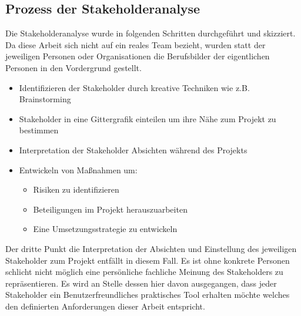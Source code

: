 \documentclass[pagesize, paper=a4, fontsize=12pt, titlepage=true, headings=small, headnosepline, abstractoff, liststotoc, nochapterprefix, plainheadsepline, twoside]{scrreprt}
\begin{document}
\subsection{Prozess der Stakeholderanalyse}
Die Stakeholderanalyse wurde in folgenden Schritten durchgeführt und skizziert. Da diese Arbeit sich nicht auf ein reales Team bezieht, wurden statt der jeweiligen Personen oder Organisationen die Berufsbilder der eigentlichen Personen in den Vordergrund gestellt.
\begin{itemize}
\item Identifizieren der Stakeholder durch kreative Techniken wie z.B. Brainstorming
\item Stakeholder in eine Gittergrafik einteilen um ihre Nähe zum Projekt zu bestimmen
\item Interpretation der Stakeholder Absichten während des Projekts
\item Entwickeln von Maßnahmen um:
	\begin{itemize}
	\item Risiken zu identifizieren
	\item Beteiligungen im Projekt herauszuarbeiten
	\item Eine Umsetzungsstrategie zu entwickeln
	\end{itemize}
\end{itemize}

Der dritte Punkt die Interpretation der Absichten und Einstellung des jeweiligen Stakeholder zum Projekt entfällt in diesem Fall. Es ist ohne konkrete Personen schlicht nicht möglich eine persönliche fachliche Meinung des Stakeholders zu repräsentieren. Es wird an Stelle dessen hier davon ausgegangen, dass jeder Stakeholder ein Benutzerfreundliches praktisches Tool erhalten möchte welches den definierten Anforderungen dieser Arbeit entspricht.
\end{document}
